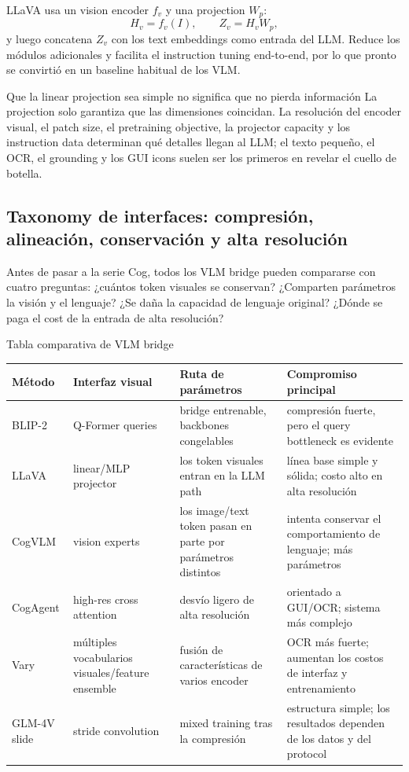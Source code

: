 LLaVA usa un vision encoder $f_v$ y una projection $W_p$:
\[
H_v=f_v(I),\qquad Z_v=H_vW_p,
\]
y luego concatena $Z_v$ con los text embeddings como entrada del LLM. Reduce los módulos adicionales y facilita el instruction tuning end-to-end, por lo que pronto se convirtió en un baseline habitual de los VLM.


\begin{warningbox}{Que la linear projection sea simple no significa que no pierda información}
La projection solo garantiza que las dimensiones coincidan. La resolución del encoder visual, el patch size, el pretraining objective, la projector capacity y los instruction data determinan qué detalles llegan al LLM; el texto pequeño, el OCR, el grounding y los GUI icons suelen ser los primeros en revelar el cuello de botella.
\end{warningbox}

\subsection{Taxonomy de interfaces: compresión, alineación, conservación y alta resolución}

Antes de pasar a la serie Cog, todos los VLM bridge pueden compararse con cuatro preguntas: ¿cuántos token visuales se conservan? ¿Comparten parámetros la visión y el lenguaje? ¿Se daña la capacidad de lenguaje original? ¿Dónde se paga el cost de la entrada de alta resolución?

\begin{knowledgebox}{Tabla comparativa de VLM bridge}
\begin{tabularx}{\textwidth}{L{0.16\textwidth} L{0.22\textwidth} L{0.23\textwidth} X}
\toprule
Método & Interfaz visual & Ruta de parámetros & Compromiso principal \\
\midrule
BLIP-2 & Q-Former queries & bridge entrenable, backbones congelables & compresión fuerte, pero el query bottleneck es evidente \\
LLaVA & linear/MLP projector & los token visuales entran en la LLM path & línea base simple y sólida; costo alto en alta resolución \\
CogVLM & vision experts & los image/text token pasan en parte por parámetros distintos & intenta conservar el comportamiento de lenguaje; más parámetros \\
CogAgent & high-res cross attention & desvío ligero de alta resolución & orientado a GUI/OCR; sistema más complejo \\
Vary & múltiples vocabularios visuales/feature ensemble & fusión de características de varios encoder & OCR más fuerte; aumentan los costos de interfaz y entrenamiento \\
GLM-4V slide & stride convolution & mixed training tras la compresión & estructura simple; los resultados dependen de los datos y del protocol \\
\bottomrule
\end{tabularx}
\end{knowledgebox}

